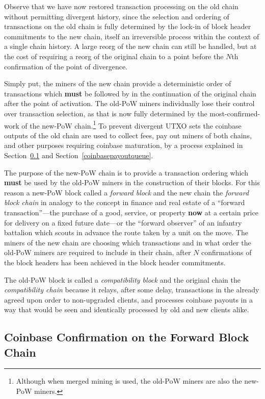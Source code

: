 Observe that we have now restored transaction processing on the old
chain without permitting divergent history, since the selection and
ordering of transactions on the old chain is fully determined by the
lock-in of block header commitments to the new chain, itself an
irreversible process within the context of a single chain history.  A
large reorg of the new chain can still be handled, but at the cost of
requiring a reorg of the original chain to a point before the $N$th
confirmation of the point of divergence.

Simply put, the miners of the new chain provide a deterministic order
of transactions which \textbf{must} be followed by in the continuation
of the original chain after the point of activation.  The old-PoW
miners individually lose their control over transaction selection, as
that is now fully determined by the most-confirmed-work of the new-PoW
chain.\footnote{Although when merged mining is used, the old-PoW
miners are also the new-PoW miners.}  To prevent divergent UTXO sets
the coinbase outputs of the old chain are used to collect fees, pay
out miners of both chains, and other purposes requiring coinbase
maturation, by a process explained in
Section~\ref{coinbaseconfirmation} and
Section~\ref{coinbasepayoutqueue}.

The purpose of the new-PoW chain is to provide a transaction ordering
which \textbf{must} be used by the old-PoW miners in the construction
of their blocks.  For this reason a new-PoW block called a
\emph{forward block} and the new chain the \emph{forward block chain}
in analogy to the concept in finance and real estate of a ``forward
transaction''---the purchase of a good, service, or property
\textbf{now} at a certain price for delivery on a fixed future
date---or the ``forward observer'' of an infantry battalion which
scouts in advance the route taken by a unit on the move.  The miners
of the new chain are choosing which transactions and in what order the
old-PoW miners are required to include in their chain, after $N$
confirmations of the block headers has been achieved in the block
header commitments.

The old-PoW block is called a \emph{compatibility block} and the
original chain the \emph{compatibility chain} because it relays, after
some delay, transactions in the already agreed upon order to
non-upgraded clients, and processes coinbase payouts in a way that
would be seen and identically processed by old and new clients alike.

\subsection{Coinbase Confirmation on the Forward Block Chain} \label{coinbaseconfirmation}

